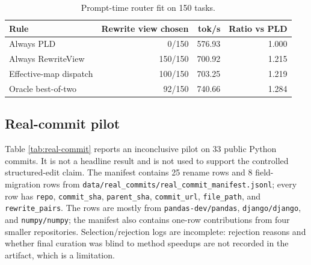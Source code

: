 \documentclass[11pt,a4paper]{article}
\begin{document}
\begin{table}[h]
\centering\scriptsize
\caption{Prompt-time router fit on 150 tasks.}
\label{tab:router-fit}
\begin{tabular}{lrrr}
\toprule
Rule & Rewrite view chosen & tok/s & Ratio vs PLD \\
\midrule
Always PLD & 0/150 & 576.93 & 1.000 \\
Always RewriteView & 150/150 & 700.92 & 1.215 \\
Effective-map dispatch & 100/150 & 703.25 & 1.219 \\
Oracle best-of-two & 92/150 & 740.66 & 1.284 \\
\bottomrule
\end{tabular}
\end{table}

\subsection{Real-commit pilot}
\label{app:real-commit-pilot}

Table \ref{tab:real-commit} reports an inconclusive pilot on 33 public
Python commits. It is not a headline result and is not used to support
the controlled structured-edit claim. The manifest contains 25 rename
rows and 8 field-migration rows from
\texttt{data/real\_commits/real\_commit\_manifest.jsonl}; every row has
\texttt{repo}, \texttt{commit\_sha}, \texttt{parent\_sha},
\texttt{commit\_url}, \texttt{file\_path}, and \texttt{rewrite\_pairs}.
The rows are mostly from \texttt{pandas-dev/pandas},
\texttt{django/django}, and \texttt{numpy/numpy}; the manifest also
contains one-row contributions from four smaller repositories.
Selection/rejection logs are incomplete: rejection reasons and whether
final curation was blind to method speedups are not recorded in the
artifact, which is a limitation.

\begin{table}[h]
\centering\scriptsize
\caption{Inconclusive real-commit/refactor pilot. Ratios are against PLD;
both confidence intervals cross 1. Quality reports exact target match,
Python syntax validity, and vanilla-output parity for the legacy prototype.
This pilot is preliminary and not part of the validated VANTAGE/SafeRoute
primary result.}
\label{tab:real-commit}
\end{table}
\end{document}
